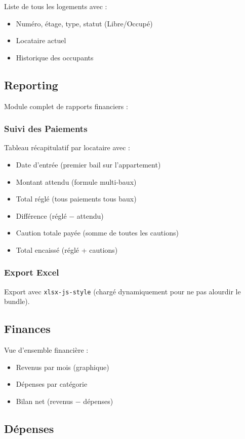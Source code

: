 \documentclass[a4paper,11pt]{article}
\begin{document}
Liste de tous les logements avec :
\begin{itemize}
  \item Numéro, étage, type, statut (Libre/Occupé)
  \item Locataire actuel
  \item Historique des occupants
\end{itemize}

\subsection{Reporting}

Module complet de rapports financiers :

\subsubsection{Suivi des Paiements}
Tableau récapitulatif par locataire avec :
\begin{itemize}
  \item Date d'entrée (premier bail sur l'appartement)
  \item Montant attendu (formule multi-baux)
  \item Total réglé (tous paiements tous baux)
  \item Différence (réglé $-$ attendu)
  \item Caution totale payée (somme de toutes les cautions)
  \item Total encaissé (réglé + cautions)
\end{itemize}

\subsubsection{Export Excel}
Export avec \texttt{xlsx-js-style} (chargé dynamiquement pour ne pas alourdir le bundle).

\subsection{Finances}

Vue d'ensemble financière :
\begin{itemize}
  \item Revenus par mois (graphique)
  \item Dépenses par catégorie
  \item Bilan net (revenus $-$ dépenses)
\end{itemize}

\subsection{Dépenses}
\end{document}
